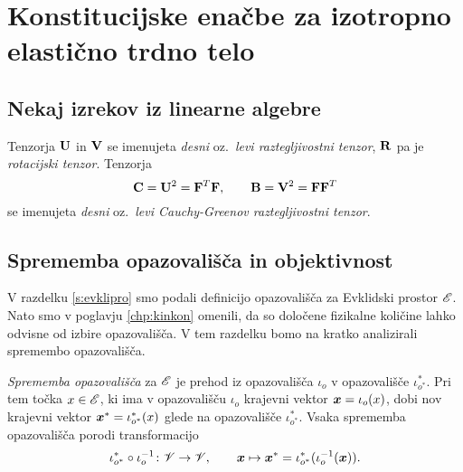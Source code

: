 \appendix

\chapter{Konstitucijske enačbe za izotropno elastično trdno telo}


\section{Nekaj izrekov iz linearne algebre}


Tenzorja $\mathbf U$ in $\mathbf V$ se imenujeta \emph{desni} oz.~\emph{levi raztegljivostni
tenzor}, $\mathbf R$ pa je \emph{rotacijski tenzor}. Tenzorja
\[
	\mathbf C=\mathbf U^2=\mathbf F^T\mathbf F,\qquad\mathbf B=\mathbf V^2=\mathbf F\mathbf F^T
\]
se imenujeta \emph{desni} oz.~\emph{levi Cauchy-Greenov raztegljivostni tenzor}.


\section{Sprememba opazovališča in objektivnost}


V razdelku \ref{s:evklipro} smo podali definicijo opazovališča za Evklidski
prostor $\mathscr E$. Nato smo v poglavju \ref{chp:kinkon} omenili, da so določene
fizikalne količine lahko odvisne od izbire opazovališča. V tem razdelku bomo
na kratko analizirali spremembo opazovališča.

\emph{Sprememba opazovališča} za $\mathscr E$ je prehod iz opazovališča $\iota_o$ v opazovališče
$\iota^*_{o^*}$. Pri tem točka $x\in\mathscr E$, ki ima v opazovališču $\iota_o$ krajevni vektor
$\boldsymbol x=\iota_o(x)$, dobi nov krajevni vektor $\boldsymbol x^*=\iota^*_{o^*}(x)$ glede na opazovališče
$\iota^*_{o^*}$. Vsaka sprememba opazovališča porodi transformacijo
\[
	\iota^*_{o^*}\circ\iota_o^{-1}\colon\mathscr V\to\mathscr V,\qquad
	\boldsymbol x\mapsto\boldsymbol x^*=\iota^*_{o^*}(\iota_o^{-1}(\boldsymbol x)).
\]

